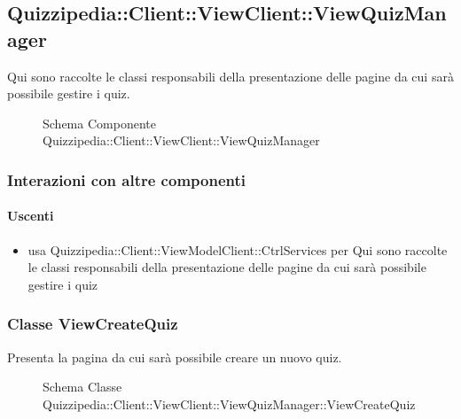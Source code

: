\subsection{Quizzipedia::Client::ViewClient::ViewQuizManager}
Qui sono raccolte le classi responsabili della presentazione delle pagine da cui sarà possibile gestire i quiz.
\begin{figure}[H]
\centering
\noindent{}
\caption[Schema Componente Quizzipedia::Client::ViewClient::ViewQuizManager]{Schema Componente Quizzipedia::Client::ViewClient::ViewQuizManager}
\end{figure}
\subsubsection{Interazioni con altre componenti}
\paragraph{Uscenti}
\begin{itemize}
\item usa Quizzipedia::Client::ViewModelClient::CtrlServices per Qui sono raccolte le classi responsabili della presentazione delle pagine da cui sarà possibile gestire i quiz
\end{itemize}
\subsubsection{Classe ViewCreateQuiz}
Presenta la pagina da cui sarà possibile creare un nuovo quiz.
\begin{figure}[H]
\centering
\noindent{}
\caption[Schema Classe ViewCreateQuiz]{Schema Classe Quizzipedia::Client::ViewClient::ViewQuizManager::ViewCreateQuiz}
\end{figure}
